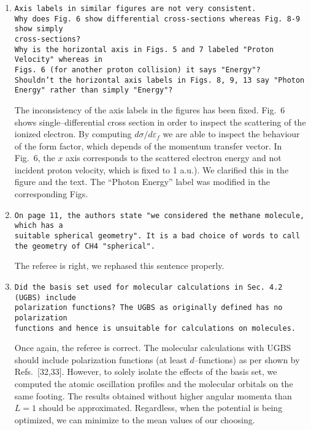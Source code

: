 \documentclass[10pt]{article}
\begin{document}
\begin{enumerate}
 \item {\tt Axis labels in similar figures are not very consistent.\\
 Why does Fig.~6 show differential cross-sections whereas Fig. 8-9 show 
 simply \\ cross-sections? \\
 Why is the horizontal axis in Figs.~5 and 7 labeled "Proton Velocity"
 whereas in \\ Figs.~6 (for another proton collision) it says "Energy"? \\
 Shouldn't the horizontal axis labels in Figs. 8, 9, 13 say "Photon Energy"
 rather than simply "Energy"?}
 
 The inconsistency of the axis labels in the figures has been fixed. 
 Fig.~6 shows single--differential cross section in order to 
 inspect the scattering of the ionized electron. 
 By computing $d\sigma/d\varepsilon_{\!f}$ we are able to inspect the 
 behaviour of the form factor, which depends of the momentum transfer 
 vector. In Fig.~6, the $x$ axis corresponds to the scattered electron 
 energy and not incident proton velocity, which is fixed to 1 a.u.).
 We clarified this in the figure and the text. The ``Photon Energy'' 
 label was modified in the corresponding Figs.
 
 \item {\tt On page 11, the authors state "we considered the methane 
 molecule, which has a \\ suitable spherical geometry". It is a bad 
 choice of words to call the geometry of CH4 "spherical".}
 
 The referee is right, we rephased this sentence properly.
 
 \item {\tt Did the basis set used for molecular calculations in
 Sec. 4.2 (UGBS) include \\ polarization functions? The UGBS as 
 originally defined has no polarization \\ functions and hence is 
 unsuitable for calculations on molecules.}
 
 Once again, the referee is correct. The molecular calculations 
 with UGBS should include polarization functions (at least $d$--functions)
 as per shown by Refs.~[32,33]. However, to solely isolate the effects 
 of the basis set, we computed the atomic oscillation profiles and the 
 molecular orbitals on the same footing. The results obtained 
 without higher angular momenta than $L=1$ should be approximated.
 Regardless, when the potential is being optimized, we can minimize to 
 the mean values of our choosing.
 

\end{enumerate}
\end{document}
